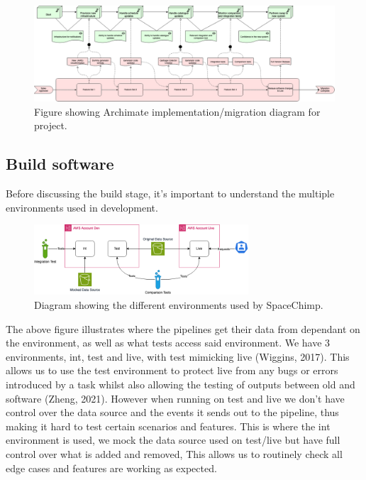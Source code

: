   \newpage

  \begin{landscape}
    \begin{figure}
      \centering
      \includegraphics[width=20cm]{assets/migration.drawio.png}
      \caption{Figure showing Archimate implementation/migration diagram for project.}
      \label{fig:migration}
    \end{figure}
  \end{landscape}

  \newpage
  \subsection{Build software}
  Before discussing the build stage, it's important to understand the multiple environments used in development.

  \begin{figure}[H]
    \centering
    \includegraphics[width=8cm]{assets/environments.drawio.png}
    \caption{Diagram showing the different environments used by SpaceChimp.}
    \label{fig:environments}
  \end{figure}

  The above figure illustrates where the pipelines get their data from dependant on the environment, as well as what tests access said environment.
  We have 3 environments, int, test and live, with test mimicking live (Wiggins, 2017). This allows us to use the test environment to protect live from 
  any bugs or errors introduced by a task whilst also allowing the testing of outputs between old and software (Zheng, 2021). However when running on test
  and live we don't have control over the data source and the events it sends out to the pipeline, thus making it hard to test certain scenarios and features.
  This is where the int environment is used, we mock the data source used on test/live but have full control over what is added and removed, This allows 
  us to routinely check all edge cases and features are working as expected.


